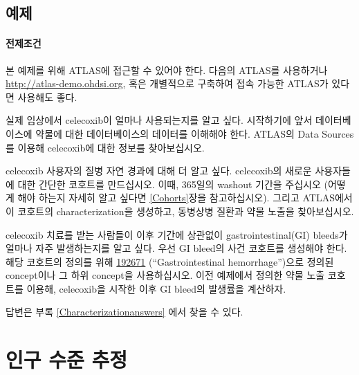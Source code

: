 \documentclass[11pt]{book}
\theoremstyle{definition}
\theoremstyle{definition}
\theoremstyle{definition}
\theoremstyle{remark}
\let\BeginKnitrBlock\begin \let\EndKnitrBlock\end
\begin{document}
\section{예제}\label{-5}

\subsubsection*{전제조건}\label{-4}

본 예제를 위해 ATLAS에 접근할 수 있어야 한다. 다음의 ATLAS를 사용하거나
\url{http://atlas-demo.ohdsi.org}, 혹은 개별적으로 구축하여 접속 가능한
ATLAS가 있다면 사용해도 좋다.

\BeginKnitrBlock{exercise}
\protect\hypertarget{exr:exerciseCharacterization1}{}{\label{exr:exerciseCharacterization1}
}실제 임상에서 celecoxib이 얼마나 사용되는지를 알고 싶다. 시작하기에
앞서 데이터베이스에 약물에 대한 데이터베이스의 데이터를 이해해야 한다.
ATLAS의 Data Sources를 이용해 celecoxib에 대한 정보를 찾아보십시오.
\EndKnitrBlock{exercise}

\BeginKnitrBlock{exercise}
\protect\hypertarget{exr:exerciseCharacterization2}{}{\label{exr:exerciseCharacterization2}
}celecoxib 사용자의 질병 자연 경과에 대해 더 알고 싶다. celecoxib의
새로운 사용자들에 대한 간단한 코호트를 만드십시오. 이때, 365일의 washout
기간을 주십시오 (어떻게 해야 하는지 자세히 알고 싶다면 \ref{Cohorts}장을
참고하십시오). 그리고 ATLAS에서 이 코호트의 characterization을 생성하고,
동병상병 질환과 약물 노출을 찾아보십시오.
\EndKnitrBlock{exercise}

\BeginKnitrBlock{exercise}
\protect\hypertarget{exr:exerciseCharacterization3}{}{\label{exr:exerciseCharacterization3}
}celecoxib 치료를 받는 사람들이 이후 기간에 상관없이
gastrointestinal(GI) bleeds가 얼마나 자주 발생하는지를 알고 싶다. 우선
GI bleed의 사건 코호트를 생성해야 한다. 해당 코호트의 정의를 위해
\href{http://athena.ohdsi.org/search-terms/terms/192671}{192671}
(``Gastrointestinal hemorrhage'')으로 정의된 concept이나 그 하위
concept을 사용하십시오. 이전 예제에서 정의한 약물 노출 코호트를 이용해,
celecoxib을 시작한 이후 GI bleed의 발생률을 계산하자.
\EndKnitrBlock{exercise}

답변은 부록 \ref{Characterizationanswers} 에서 찾을 수 있다.

\chapter{인구 수준 추정}\label{PopulationLevelEstimation}
\end{document}
